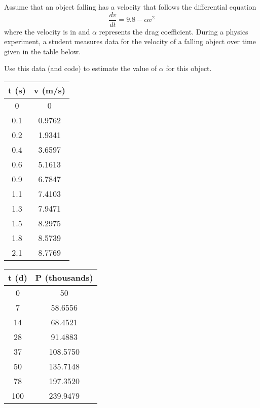 \begin{exercise}\label{ex:ModelingParamVel}\ansMark%
Assume that an object falling has a velocity that follows the differential equation 
\begin{equation*}
\frac{dv}{dt} = 9.8 - \alpha v^2
\end{equation*}
where the velocity is in  and $\alpha$ represents the drag coefficient. During a physics experiment, a student measures data for the velocity of a falling object over time given in the table below.

Use this data (and code) to estimate the value of $\alpha$ for this object. 
\end{exercise} 
\begin{minipage}{0.49\textwidth}
\centering
    \begin{tabular}{|c|c|}\hline
         \textbf{t} (s)& \textbf{v} (m/s)  \\ \hline
        0 & 0 \\
	0.1 &0.9762 \\
	0.2 &  1.9341 \\
	0.4 & 3.6597 \\
	0.6 & 5.1613 \\
	0.9 & 6.7847 \\
	1.1 & 7.4103 \\
	1.3 & 7.9471 \\
	1.5 & 8.2975 \\
	1.8 & 8.5739\\
	2.1 & 8.7769  \\ \hline
    \end{tabular}
\end{minipage}%
\begin{minipage}{0.49\textwidth}
    \centering
    \begin{tabular}{|c|c|}\hline
         \textbf{t} (d)& \textbf{P} (thousands)  \\ \hline
        0 & 50 \\
       7  & 58.6556 \\
        14 & 68.4521 \\
        28 & 91.4883 \\
        37 & 108.5750 \\
         50 & 135.7148 \\
        78 & 197.3520 \\
        100 & 239.9479
         \\ \hline
    \end{tabular}
\end{minipage}

